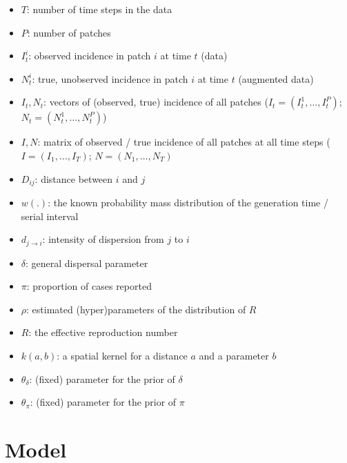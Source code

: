 \documentclass[a4paper,11pt]{article}
\begin{document}
\begin{itemize}
 \item $T$: number of time steps in the data
 \item $P$: number of patches
 \item $I_t^i$: observed incidence in patch $i$ at time $t$ (data)
 \item $N_t^i$: true, unobserved incidence in patch $i$ at time $t$ (augmented 
data)
 \item $I_t, N_t$: vectors of (observed, true) incidence of all patches 
 ($I_t = (I_t^1, \ldots, I_t^P)$; $N_t = (N_t^1, \ldots, N_t^P)$)
 \item $I,N$: matrix of observed / true incidence of all patches at all time 
steps ($I = (I_1, \ldots, I_T)$; $N = (N_1, \ldots, N_T)$
 \item $D_{ij}$: distance between $i$ and $j$
 \item $w(.)$: the known probability mass distribution of the generation time / serial interval
 \item $d_{j\rightarrow i}$: intensity of dispersion from $j$ to $i$
 \item $\delta$: general dispersal parameter
 \item $\pi$: proportion of cases reported
 \item $\rho$: estimated (hyper)parameters of the distribution of $R$
 \item $R$: the effective reproduction 
number
 \item $k(a,b)$: a spatial kernel for a distance $a$ and a parameter $b$
 \item $\theta_{\delta}$: (fixed) parameter for the prior of 
$\delta$
 \item $\theta_{\pi}$: (fixed) parameter for the prior of $\pi$
\end{itemize}





\section{Model}
\end{document}

